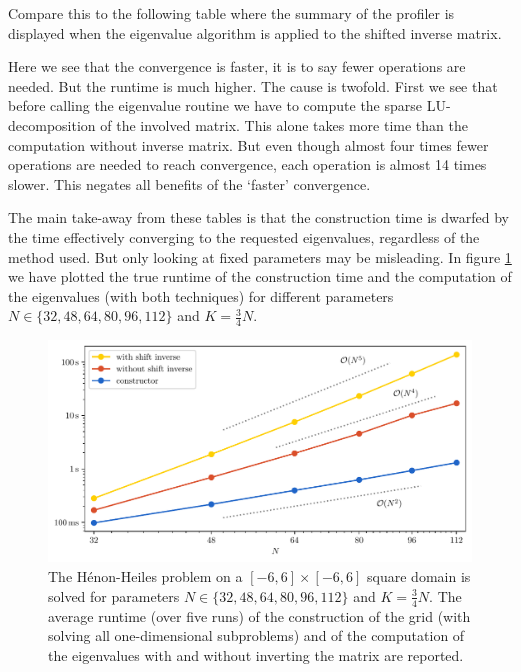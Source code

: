 Compare this to the following table where the summary of the profiler is displayed when the eigenvalue algorithm is applied to the shifted inverse matrix.
\begin{center}
    
\end{center}
Here we see that the convergence is faster, it is to say fewer operations are needed. But the runtime  is much higher. The cause is twofold. First we see that before calling the eigenvalue routine we have to compute the sparse LU-decomposition of the involved matrix. This alone takes more time than the computation without inverse matrix. But even though almost four times fewer operations are needed to reach convergence, each operation is almost 14 times slower. This negates all benefits of the `faster' convergence.

The main take-away from these tables is that the construction time is dwarfed by the time effectively converging to the requested eigenvalues, regardless of the method used. But only looking at fixed parameters may be misleading. In figure \ref{fig:c4_benchmark_timings} we have plotted the true runtime of the construction time and the computation of the eigenvalues (with both techniques) for different parameters $N \in \{32,48,64,80,96,112\}$ and $K = \frac{3}{4}N$.

\begin{figure}
    \begin{center}
        \includegraphics[width=\textwidth]{img/chapter4/benchmark/benchmark_timings.pdf}
    \end{center}
    \caption{The Hénon-Heiles problem on a $[-6,6] \times [-6,6]$ square domain is solved for parameters $N \in \{32,48,64,80,96,112\}$ and $K = \frac{3}{4}N$. The average runtime (over five runs) of the construction of the grid (with solving all one-dimensional subproblems) and of the computation of the eigenvalues with and without inverting the matrix are reported.\label{fig:c4_benchmark_timings}}
\end{figure}

